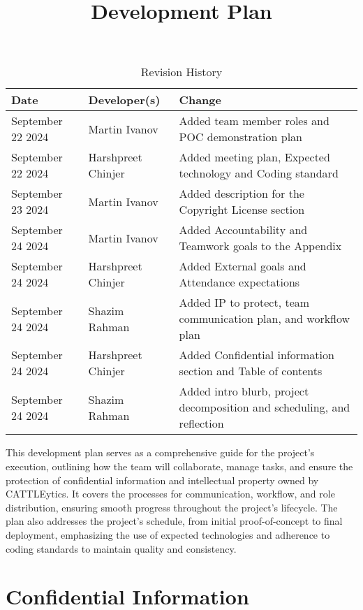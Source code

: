 \documentclass{article}
\title{Development Plan\\\progname}
\author{\authname}
\date{}
\begin{document}
\maketitle

\begin{table}[hp]
\caption{Revision History} \label{TblRevisionHistory}
\begin{tabularx}{\textwidth}{llX}
\toprule
\textbf{Date} & \textbf{Developer(s)} & \textbf{Change}\\
\midrule
September 22 2024 & Martin Ivanov & Added team member roles and POC
demonstration plan\\
September 22 2024 & Harshpreet Chinjer & Added meeting plan, Expected technology
and Coding standard\\
September 23 2024 & Martin Ivanov & Added description for the Copyright License
section\\
September 24 2024 & Martin Ivanov & Added Accountability and Teamwork goals to
the Appendix\\
September 24 2024 & Harshpreet Chinjer & Added External goals and Attendance
expectations\\
September 24 2024 & Shazim Rahman & Added IP to protect, team communication
plan, and workflow plan\\
September 24 2024 & Harshpreet Chinjer & Added Confidential information section
and Table of contents\\
September 24 2024 & Shazim Rahman & Added intro blurb, project decomposition and
scheduling, and reflection\\
\bottomrule
\end{tabularx}
\end{table}

\newpage{}

\tableofcontents

\newpage{}
This development plan serves as a comprehensive guide for the project's
execution, outlining how the team will collaborate, manage tasks, and ensure the
protection of confidential information and intellectual property owned by
CATTLEytics. It covers the processes for communication, workflow, and role
distribution, ensuring smooth progress throughout the project's lifecycle. The
plan also addresses the project's schedule, from initial proof-of-concept to
final deployment, emphasizing the use of expected technologies and adherence to
coding standards to maintain quality and consistency.

\section{Confidential Information}
\end{document}
